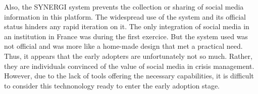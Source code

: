 Also, the SYNERGI system prevents the collection or sharing of social media information in this platform.
The widespread use of the system and its official status hinders any rapid iteration on it.
The only integration of social media in an institution in France was during the first exercice.
But the system used was not official and was more like a home-made design that met a practical need.
Thus, it appears that the early adopters are unfortunately not so much.
Rather, they are individuals convinced of the value of social media in crisis management.
However, due to the lack of tools offering the necessary capabilities, it is difficult to consider this technonology ready to enter the early adoption stage.

